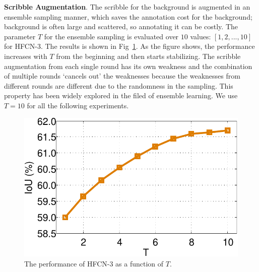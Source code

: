 \documentclass[runningheads]{llncs}
\begin{document}
\textbf{Scribble Augmentation}.
The scribble for the background is augmented in an ensemble sampling manner, which saves the annotation cost for the background; background is often large and scattered, so annotating it can be costly. The parameter $T$ for the ensemble sampling is evaluated over $10$ values: $[1, 2, ..., 10]$ for HFCN-3.  The results is shown in Fig~\ref{fig:scribble:aug}. As the figure shows, the performance increases with $T$ from the beginning and then starts stabilizing. 
The  scribble augmentation from each single round has its own weakness and the combination of multiple rounds `cancels out' the weaknesses because the weaknesses from different rounds are different due to the randomness in the sampling. This property has been widely explored in the filed of ensemble learning. We use $T=10$ for all the following experiments.  

\begin{figure}  
\vspace{-6mm}
  \includegraphics[width=0.95\linewidth, height=0.65\linewidth]{fig7/scribble_aug_curve.pdf}  \vspace{-3mm} 
  \caption{The performance of HFCN-3 as a function of $T$.}
\label{fig:scribble:aug}  \vspace{-6mm}
\end{figure}
\end{document}
